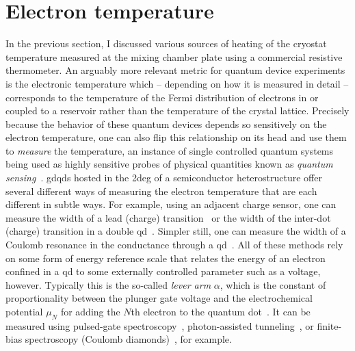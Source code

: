 \section{Electron temperature}\label{sec:setup:cooling:etemp}
In the previous section, I discussed various sources of heating of the cryostat temperature measured at the mixing chamber plate using a commercial resistive thermometer.
An arguably more relevant metric for quantum device experiments is the electronic temperature which -- depending on how it is measured in detail -- corresponds to the temperature of the Fermi distribution of electrons in or coupled to a reservoir rather than the temperature of the crystal lattice.
Precisely because the behavior of these quantum devices depends so sensitively on the electron temperature, one can also flip this relationship on its head and use them to \emph{measure} the temperature, an instance of single controlled quantum systems being used as highly sensitive probes of physical quantities known as \emph{quantum sensing}~\cite{Degen2017}.
\Glspl{gdqd} hosted in the \gls{2deg} of a semiconductor heterostructure offer several different ways of measuring the electron temperature that are each different in subtle ways.
For example, using an adjacent charge sensor, one can measure the width of a lead
(charge) transition~\cite{Maradan2014} or the width of the inter-dot (charge) transition in a double \gls{qd}~\cite{DiCarlo2004}.
Simpler still, one can measure the width of a Coulomb resonance in the conductance through a \gls{qd}~\cite{Ihn2009,Maradan2014}.
All of these methods rely on some form of energy reference scale that relates the energy of an electron confined in a \gls{qd} to some externally controlled parameter such as a voltage, however.
Typically this is the so-called \emph{lever arm} $\alpha$, which is the constant of proportionality between the plunger gate voltage and the electrochemical potential $\mu_N$ for adding the $N$th electron to the quantum dot~\cite{Ihn2009}.
It can be measured using pulsed-gate spectroscopy~\cite{Fujisawa2001,Harbusch2010}, photon-assisted tunneling~\cite{Kouwenhoven1994}, or finite-bias spectroscopy (Coulomb diamonds)~\cite{Kouwenhoven2001,Ihn2009}, for example.

